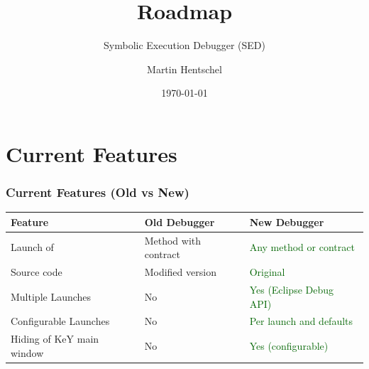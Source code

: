 \documentclass[accentcolor=tud9d,colorbacktitle,inverttitle,landscape,english,presentation,t]{tudbeamer}
\begin{document}
\title{Roadmap}
\subtitle{Symbolic Execution Debugger (SED)}

\author{Martin Hentschel}


\date{\today}

\begin{titleframe}
\end{titleframe}


\section{Current Features}

	\begin{frame}[t]
		\frametitle{Current Features (Old vs New)}
      
      \begin{table}
         \centering
            \begin{tabular}{|l|l|l|}
               \hline
               Feature & Old Debugger & New Debugger \\
               \hline
               \hline
               Launch of & Method with contract & \textcolor{darkgreen}{Any method or contract} \\
               Source code & Modified version & \textcolor{darkgreen}{Original} \\
               Multiple Launches & No & \textcolor{darkgreen}{Yes (Eclipse Debug API)} \\
               Configurable Launches & No & \textcolor{darkgreen}{Per launch and defaults} \\
               Hiding of KeY main window & No & \textcolor{darkgreen}{Yes (configurable)} \\
               \hline
            \end{tabular}
      \end{table}
	\end{frame}
   
\end{document}
